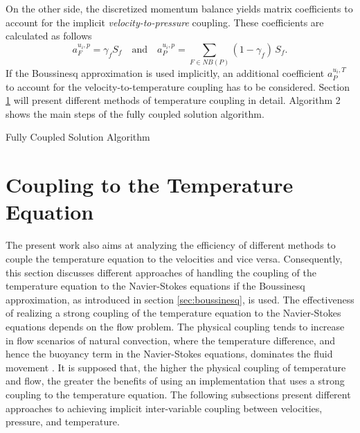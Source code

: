 On the other side, the discretized momentum balance yields matrix coefficients to account for the implicit \emph{velocity-to-pressure} coupling. These coefficients are calculated as follows
\begin{displaymath}
  a_F^{u_i,p} =  \gamma_f S_f \quad \text{and} \quad a_P^{u_i,p} = \sum_{F \in NB(P)} (1-\gamma_f) \, S_f.
\end{displaymath}
If the Boussinesq approximation is used implicitly, an additional coefficient \(a_P^{u_i,T}\) to account for the velocity-to-temperature coupling has to be considered. Section \ref{sec:temperaturecoupling} will present different methods of temperature coupling in detail. Algorithm 2 shows the main steps of the fully coupled solution algorithm.

\begin{algorithm}
\label{al:coupled}
\caption{Fully Coupled Solution Algorithm}
\begin{algorithmic}
\Else
\EndIf
{}
\EndIf
\EndWhile
{}
\EndIf
\end{algorithmic}
\end{algorithm}

\section{Coupling to the Temperature Equation}
\label{sec:temperaturecoupling}

The present work also aims at analyzing the efficiency of different methods to couple the temperature equation to the velocities and vice versa. Consequently, this section discusses different approaches of handling the coupling of the temperature equation to the Navier-Stokes equations if the Boussinesq approximation, as introduced in section \ref{sec:boussinesq}, is used. The effectiveness of realizing a strong coupling of the temperature equation to the Navier-Stokes equations depends on the flow problem. The physical coupling tends to increase in flow scenarios of natural convection, where the temperature difference, and hence the buoyancy term in the Navier-Stokes equations, dominates the fluid movement \cite{ferziger02,vakilipour12}. It is supposed that, the higher the physical coupling of temperature and flow, the greater the benefits of using an implementation that uses a strong coupling to the temperature equation. The following subsections present different approaches to achieving implicit inter-variable coupling between velocities, pressure, and temperature.
      
